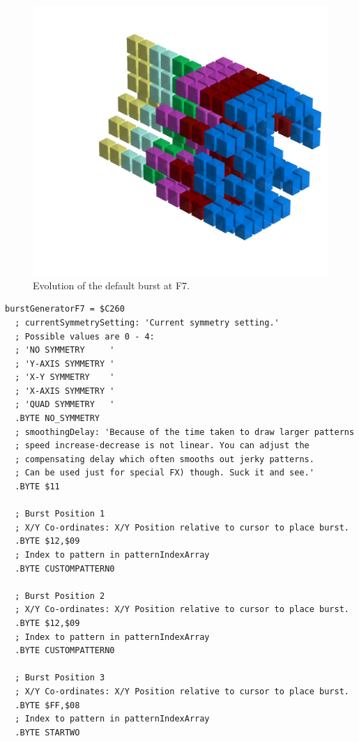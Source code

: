 \clearpage
{}
\begin{figure}[H]
    \centering
    \begin{adjustbox}{width=12cm,center}
      \includegraphics[width=12cm]{src/patterns/bursts/pattern3-45.png}%
    \end{adjustbox}
\caption{Evolution of the default burst at F7.}
\end{figure}
\clearpage

\begin{lstlisting}[caption=Source code for the F7 Burst.]
burstGeneratorF7 = $C260
  ; currentSymmetrySetting: 'Current symmetry setting.'
  ; Possible values are 0 - 4:
  ; 'NO SYMMETRY     '
  ; 'Y-AXIS SYMMETRY '
  ; 'X-Y SYMMETRY    '
  ; 'X-AXIS SYMMETRY '
  ; 'QUAD SYMMETRY   '
  .BYTE NO_SYMMETRY
  ; smoothingDelay: 'Because of the time taken to draw larger patterns
  ; speed increase-decrease is not linear. You can adjust the 
  ; compensating delay which often smooths out jerky patterns. 
  ; Can be used just for special FX) though. Suck it and see.'
  .BYTE $11

  ; Burst Position 1
  ; X/Y Co-ordinates: X/Y Position relative to cursor to place burst.
  .BYTE $12,$09
  ; Index to pattern in patternIndexArray
  .BYTE CUSTOMPATTERN0

  ; Burst Position 2
  ; X/Y Co-ordinates: X/Y Position relative to cursor to place burst.
  .BYTE $12,$09
  ; Index to pattern in patternIndexArray
  .BYTE CUSTOMPATTERN0

  ; Burst Position 3
  ; X/Y Co-ordinates: X/Y Position relative to cursor to place burst.
  .BYTE $FF,$08
  ; Index to pattern in patternIndexArray
  .BYTE STARTWO

\end{lstlisting}

